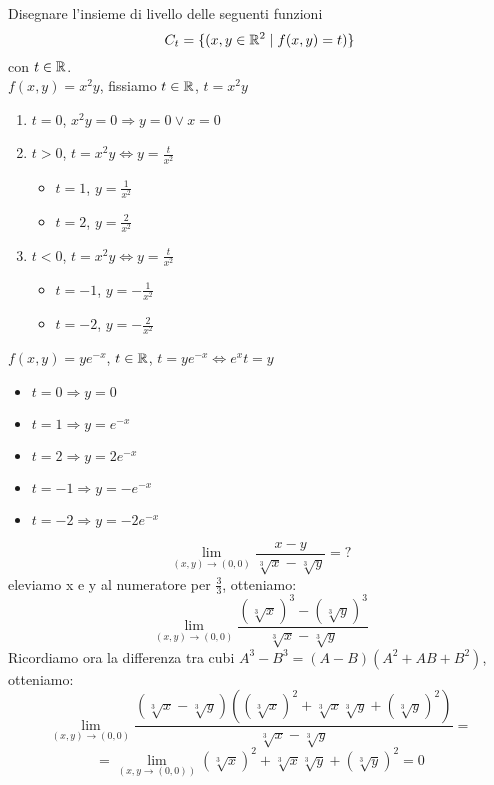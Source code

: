 \begin{eexercise}
  Disegnare l'insieme di livello delle seguenti funzioni
  $$C_t = \{(x,y\in\mathbb{R}^2 \mid f(x,y) = t)\}$$
  con $t \in \mathbb{R}$.\\
  $f(x,y) = x^2y$, fissiamo $t \in \mathbb{R}$, $t = x^2y$
  \begin{enumerate}
    \item $t = 0$, $x^2y = 0 \Rightarrow y = 0 \vee x = 0$
    \item $t > 0$, $t = x^2y \iff y = \frac{t}{x^2}$
    \begin{itemize}
      \item $t = 1$, $y = \frac{1}{x^2}$
      \item $t = 2$, $y = \frac{2}{x^2}$
    \end{itemize}
    \item $t < 0$, $t = x^2y \iff y = \frac{t}{x^2}$
    \begin{itemize}
      \item $t = -1$, $y = -\frac{1}{x^2}$
      \item $t = -2$, $y = -\frac{2}{x^2}$
    \end{itemize}
  \end{enumerate}
\end{eexercise}
\begin{eexercise}
  $f(x,y) = ye^{-x}$, $t\in\mathbb{R}$, $t=ye^{-x} \iff e^x t = y$
  \begin{itemize}
    \item $t=0 \Rightarrow y = 0$
    \item $t=1 \Rightarrow y = e^{-x}$
    \item $t=2 \Rightarrow y = 2e^{-x}$
    \item $t=-1 \Rightarrow y = -e^{-x}$
    \item $t=-2 \Rightarrow y = -2e^{-x}$
  \end{itemize}
\end{eexercise}
\begin{eexercise}
  $$\lim_{(x,y)\to (0,0)} \frac{x-y}{\sqrt[3]{x}-\sqrt[3]{y}} = ?$$
  eleviamo x e y al numeratore per $\frac{3}{3}$, otteniamo:
  $$\lim_{(x,y)\to (0,0)} \frac{(\sqrt[3]{x})^3-(\sqrt[3]{y})^3}{\sqrt[3]{x}-\sqrt[3]{y}}$$
  Ricordiamo ora la differenza tra cubi $A^3 - B^3 = (A-B)(A^2+AB+B^2)$, otteniamo:
  $$\lim_{(x,y)\to (0,0)} \frac{(\sqrt[3]{x}-\sqrt[3]{y})\left((\sqrt[3]{x})^2 + \sqrt[3]{x}\sqrt[3]{y} + (\sqrt[3]{y})^2\right)}{\sqrt[3]{x}-\sqrt[3]{y}} = $$
  $$= \lim_{(x,y \to (0,0))} (\sqrt[3]{x})^2 + \sqrt[3]{x}\sqrt[3]{y} + (\sqrt[3]{y})^2 = 0$$
\end{eexercise}
